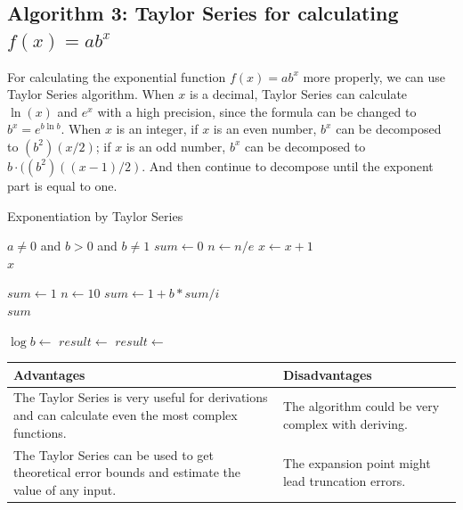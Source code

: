\documentclass[11pt]{article}
\begin{document}
\subsection{Algorithm 3: Taylor Series for calculating $f(x) = ab^x$}
For calculating the exponential function $f(x) = ab^x$ more properly, we can use Taylor Series algorithm. When $x$ is a decimal, Taylor Series can calculate $\ln(x)$ and $e^x$ with a high precision, since the formula can be changed to $b^x = e^{b\ln b}$. When $x$ is an integer, if $x$ is an even number, $b^x$ can be decomposed to $(b^2) (x/2)$; if $x$ is an odd number, $b^x$ can be decomposed to $b\cdot ((b^2) ((x-1)/2)$. And then continue to decompose until the exponent part is equal to one\cite{abad2012algorithm}.

\begin{algorithm}
\caption{Exponentiation by Taylor Series\cite{Anu:Stack_Overflow}}\label{exp1}
\begin{algorithmic}[1]
\Require $a \neq 0$ and $b > 0$ and $b \neq 1$ 
\State $sum\gets 0$
    \State $n\gets n/e$
    \State $x \gets x + 1 $
\EndWhile \\
\Return $x$
\EndFunction

\State $sum\gets 1$
\State $n\gets 10$
\State $sum\gets 1+ b * sum / i$
\EndFor \\
\Return $sum$
\EndFunction

\State $\log b \gets $
\State $result \gets $
\State $result \gets $
\end{algorithmic}
\end{algorithm}

\begin{center}
    \begin{tabular}{|p{7cm}|p{7cm}|}\hline
        \textbf{Advantages} & \textbf{Disadvantages}\\\hline
        The Taylor Series is very useful for derivations and can calculate even the most complex functions. & The algorithm could be very complex with deriving.\\\hline The Taylor Series can be used to get theoretical error bounds and estimate the value of any input\cite{hariharan2010comparative}.  & The expansion point might lead truncation errors.\\\hline
    \end{tabular}
\end{center}
\end{document}
